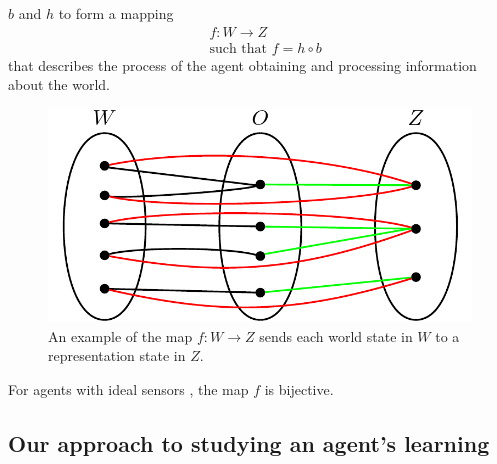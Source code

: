  $b$ and $h$ to form a mapping
\begin{equation}
\begin{aligned}
	& f: W \to Z \\
	& \text{such that } f = h \circ b
\end{aligned}
\end{equation}
that describes the process of the agent obtaining and processing information about the world.

\begin{figure}[H]
	\centering
	\includegraphics[width=0.5\linewidth]{2MathematicalFramework/Images/W_to_O_to_Z_mapping.png}
	\caption{
		An example of the map $f: W \to Z$ sends each world state in $W$ to a representation state in $Z$.
	}
	\label{fig:W_to_Z}
\end{figure}


\begin{propositionE}[][normal]
    For agents with ideal sensors , the map $f$ is bijective.
\end{propositionE}
\begin{proofE}
\end{proofE}


\subsection{Our approach to studying an agent's learning}

